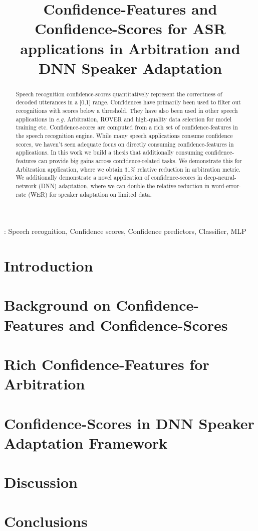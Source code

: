 \documentclass[a4paper]{article}
\title{Confidence-Features and Confidence-Scores for ASR applications in Arbitration and DNN Speaker Adaptation}
\begin{document}
\maketitle

\begin{abstract}
Speech recognition confidence-scores quantitatively represent the correctness of
decoded utterances in a [0,1] range. Confidences have primarily been used to filter out recognitions
with scores below a threshold. They have also been used in other speech applications in \emph{e.g.} Arbitration, ROVER
and high-quality data selection for model training etc. Confidence-scores are computed from a rich set of confidence-features in the speech recognition engine. While many speech applications consume confidence scores, we haven't seen adequate focus on directly consuming confidence-features in applications. In this work we build a thesis that additionally consuming confidence-features can provide big gains across confidence-related tasks. We demonstrate this for Arbitration application, where we obtain 31\% relative reduction in arbitration metric. We additionally demonstrate a novel application of confidence-scores in deep-neural-network (DNN) adaptation, where we can double the relative reduction in word-error-rate (WER) for speaker adaptation on limited data.
\end{abstract}
: Speech recognition, Confidence scores, Confidence predictors, Classifier, MLP

%
\section{Introduction}\label{Sec:Intro}


\section{Background on Confidence-Features and Confidence-Scores}\label{Sec:CC-Background}



\section{Rich Confidence-Features for Arbitration}\label{Sec:Arbitration}


\section{Confidence-Scores in DNN Speaker Adaptation Framework}\label{Sec:Adaptation}


\section{Discussion}\label{Sec:Discussion}


\section{Conclusions}\label{Sec:Conclusion}


%


\end{document}
